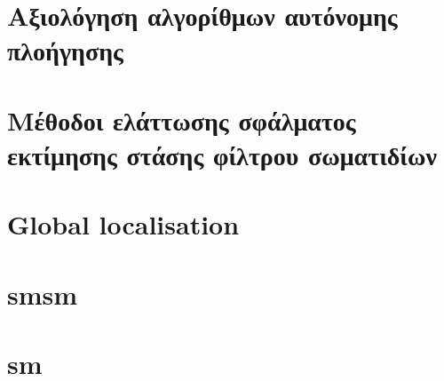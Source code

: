 \chapter{Αξιολόγηση αλγορίθμων αυτόνομης πλοήγησης}
  \label{part:02:chapter:01}
  

\chapter{Μέθοδοι ελάττωσης σφάλματος εκτίμησης στάσης φίλτρου σωματιδίων}
  \label{part:02:chapter:02}
  

\chapter{Global localisation}
  \label{part:02:chapter:03}
\chapter{smsm}
  \label{part:02:chapter:04}
\chapter{sm}
  \label{part:02:chapter:05}
